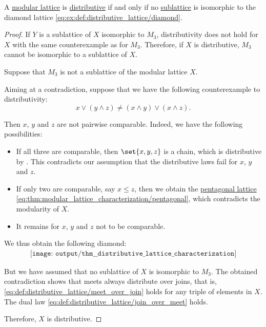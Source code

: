 \begin{proposition}\label{thm:distributive_modular_lattice_characterization}
  A \hyperref[def:modular_lattice]{modular lattice} is \hyperref[def:modular_lattice]{distributive} if and only if no \hyperref[def:lattice/submodel]{sublattice} is isomorphic to the diamond lattice \eqref{eq:ex:def:distributive_lattice/diamond}.
\end{proposition}
\begin{proof}
  \SufficiencySubProof If \( Y \) is a sublattice of \( X \) isomorphic to \( M_3 \), distributivity does not hold for \( X \) with the same counterexample  as for \( M_3 \). Therefore, if \( X \) is distributive, \( M_3 \) cannot be isomorphic to a sublattice of \( X \).

  \NecessitySubProof Suppose that \( M_3 \) is not a sublattice of the modular lattice \( X \).

  Aiming at a contradiction, suppose that we have the following counterexample to distributivity:
  \begin{equation*}
    x \vee (y \wedge z) \neq (x \wedge y) \vee (x \wedge z).
  \end{equation*}

  Then \( x \), \( y \) and \( z \) are not pairwise comparable. Indeed, we have the following possibilities:
  \begin{itemize}
    \item If all three are comparable, then \( \set{ x, y, z } \) is a chain, which is distributive by . This contradicts our assumption that the distributive laws fail for \( x \), \( y \) and \( z \).

    \item If only two are comparable, say \( x \leq z \), then we obtain the \hyperref[ex:def:modular_lattice/pentagon]{pentagonal lattice} \eqref{eq:thm:modular_lattice_characterization/pentagonal}, which contradicts the modularity of \( X \).

    \item It remains for \( x \), \( y \) and \( z \) not to be comparable.
  \end{itemize}

  We thus obtain the following diamond:
  \begin{equation}\label{eq:thm:distributive_lattice_characterization/diamond}
    \begin{aligned}
      \texttt{[image: output/thm\_\_distributive\_lattice\_characterization]}
    \end{aligned}
  \end{equation}

  But we have assumed that no sublattice of \( X \) is isomorphic to \( M_3 \). The obtained contradiction shows that meets always distribute over joins, that is, \eqref{eq:def:distributive_lattice/meet_over_join} holds for any triple of elements in \( X \). The dual law \eqref{eq:def:distributive_lattice/join_over_meet} holds.

  Therefore, \( X \) is distributive.
\end{proof}


